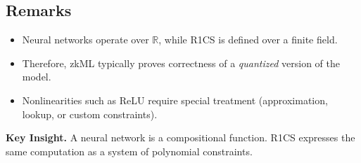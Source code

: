 \subsection{Remarks}

\begin{itemize}
\item Neural networks operate over $\mathbb{R}$, while R1CS is defined over a finite field.
\item Therefore, zkML typically proves correctness of a \emph{quantized} version of the model.
\item Nonlinearities such as ReLU require special treatment (approximation, lookup, or custom constraints).
\end{itemize}

\medskip

\noindent
\textbf{Key Insight.}  
A neural network is a compositional function.  
R1CS expresses the same computation as a system of polynomial constraints.